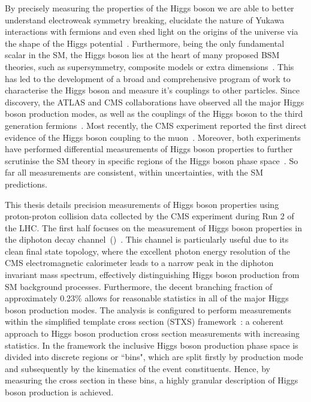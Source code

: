 By precisely measuring the properties of the Higgs boson we are able to better understand electroweak symmetry breaking, elucidate the nature of Yukawa interactions with fermions and even shed light on the origins of the universe via the shape of the Higgs potential~\cite{Kajantie:1995kf,Csikor:1998eu}. Furthermore, being the only fundamental scalar in the SM, the Higgs boson lies at the heart of many proposed BSM theories, such as supersymmetry, composite models or extra dimensions~\cite{Martin:1997ns,Witzel:2019jbe,Quiros:2013yaa}. This has led to the development of a broad and comprehensive program of work to characterise the Higgs boson and measure it's couplings to other particles. Since discovery, the ATLAS and CMS collaborations have observed all the major Higgs boson production modes, as well as the couplings of the Higgs boson to the third generation fermions~\cite{Aaboud:2018urx,Aaboud:2018zhk,Aaboud:2018pen,Sirunyan:2018hoz,Sirunyan:2018kst,Sirunyan:2017khh}. Most recently, the CMS experiment reported the first direct evidence of the Higgs boson coupling to the muon~\cite{Sirunyan:2020two}. Moreover, both experiments have performed differential measurements of Higgs boson properties to further scrutinise the SM theory in specific regions of the Higgs boson phase space~\cite{ATLAS:2020wny,ATLAS-CONF-2019-029,Aad:2020jym,Sirunyan:2020hwz,Sirunyan:2020tzo}. So far all measurements are consistent, within uncertainties, with the SM predictions.

This thesis details precision measurements of Higgs boson properties using proton-proton collision data collected by the CMS experiment during Run 2 of the LHC. The first half focuses on the measurement of Higgs boson properties in the diphoton decay channel~(\Hgg)~\cite{CMS-PAS-HIG-19-015}. This channel is particularly useful due to its clean final state topology, where the excellent photon energy resolution of the CMS electromagnetic calorimeter leads to a narrow peak in the diphoton invariant mass spectrum, effectively distinguishing Higgs boson production from SM background processes. Furthermore, the decent branching fraction of approximately 0.23\% allows for reasonable statistics in all of the major Higgs boson production modes. The analysis is configured to perform measurements within the simplified template cross section (STXS) framework~\cite{deFlorian:2016spz}: a coherent approach to Higgs boson production cross section measurements with increasing statistics. In the framework the inclusive Higgs boson production phase space is divided into discrete regions or ``bins", which are split firstly by production mode and subsequently by the kinematics of the event constituents. Hence, by measuring the cross section in these bins, a highly granular description of Higgs boson production is achieved.


